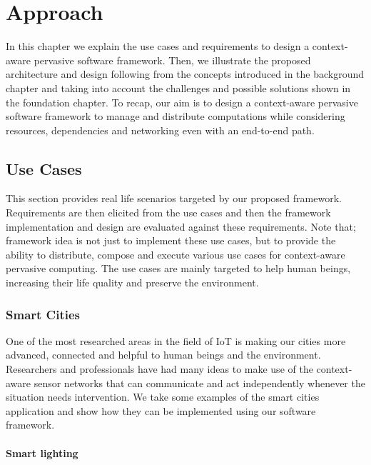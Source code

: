 
 \chapter{Approach}\label{chapter:Approach}
 In this chapter we explain the use cases and requirements to design a context-aware pervasive software framework. Then, we illustrate the  proposed architecture and design following from the concepts introduced in the background chapter and taking into account the challenges and possible solutions shown in the foundation chapter. To recap,  our aim is to design a context-aware pervasive software framework to manage and distribute computations while considering resources, dependencies and networking even with an end-to-end path.

\section{Use Cases}
This section provides real life scenarios targeted by our proposed framework. Requirements are then elicited from the use cases and then the framework implementation and design are evaluated against these requirements. Note that; framework idea is not just to implement these use cases, but to provide the ability to distribute, compose and execute various use cases for context-aware pervasive computing. The use cases are mainly targeted to help human beings, increasing their life quality and preserve the environment. 

\subsection{Smart Cities}
One of the most researched areas in the field of IoT is making our cities more advanced, connected and helpful to human beings and the environment. Researchers and professionals have had many ideas to make use of the context-aware sensor networks that can communicate and act independently whenever the situation needs intervention. We take some examples of the smart cities application and show how they can be implemented using our software framework.

\subsubsection{Smart lighting}

